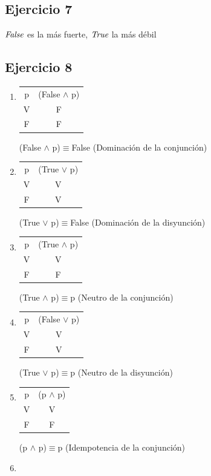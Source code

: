 	\subsection{Ejercicio 7}
	$\emph{False}$ es la m\'as fuerte,  $\emph{True}$ la m\'as d\'ebil
	\subsection{Ejercicio 8}
	\begin{enumerate}[label=(\alph*)]
		\item 
		\begin{tabular}{c|c}
			p & (False $\wedge$ p)\\
			V & F\\
			F & F\\
		\end{tabular}
		(False $\wedge$ p)$\equiv$False (Dominaci\'on de la conjunci\'on)
		\item 
		\begin{tabular}{c|c}
			p & (True $\vee$ p)\\
			V & V\\
			F & V\\
		\end{tabular}
		(True $\vee$ p)$\equiv$False (Dominaci\'on de la disyunci\'on)
		\item 
		\begin{tabular}{c|c}
			p & (True $\wedge$ p)\\
			V & V\\
			F & F\\
		\end{tabular}
		(True $\wedge$ p)$\equiv$p (Neutro de la conjunci\'on)
		\item 
		\begin{tabular}{c|c}
			p & (False $\vee$ p)\\
			V & V\\
			F & V\\
		\end{tabular}
		(True $\vee$ p)$\equiv$p (Neutro de la disyunci\'on)
		\item 
		\begin{tabular}{c|c}
			p & (p $\wedge$ p)\\
			V & V\\
			F & F\\
		\end{tabular}
		(p $\wedge$ p)$\equiv$p (Idempotencia de la conjunci\'on)
		\item 
		\begin{tabular}{c|c}

\end{tabular}
\end{enumerate}
